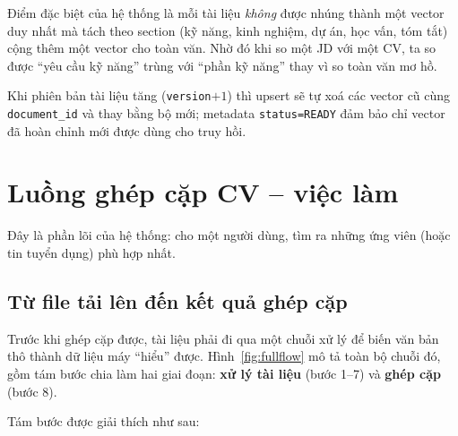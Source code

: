 \documentclass[a4paper,11pt]{article}
\begin{document}
Điểm đặc biệt của hệ thống là mỗi tài liệu \emph{không} được nhúng thành một vector duy
nhất mà tách theo section (kỹ năng, kinh nghiệm, dự án, học vấn, tóm tắt) cộng thêm một
vector cho toàn văn. Nhờ đó khi so một JD với một CV, ta so được ``yêu cầu kỹ năng''
trùng với ``phần kỹ năng'' thay vì so toàn văn mơ hồ.



Khi phiên bản tài liệu tăng (\texttt{version}$+1$) thì upsert sẽ tự xoá các vector cũ
cùng \texttt{document\_id} và thay bằng bộ mới; metadata \texttt{status=READY} đảm bảo
chỉ vector đã hoàn chỉnh mới được dùng cho truy hồi.

\section{Luồng ghép cặp CV -- việc làm}

Đây là phần lõi của hệ thống: cho một người dùng, tìm ra những ứng viên (hoặc tin
tuyển dụng) phù hợp nhất.

\subsection{Từ file tải lên đến kết quả ghép cặp}

Trước khi ghép cặp được, tài liệu phải đi qua một chuỗi xử lý để biến văn bản thô thành
dữ liệu máy ``hiểu'' được. Hình~\ref{fig:fullflow} mô tả toàn bộ chuỗi đó, gồm tám bước
chia làm hai giai đoạn: \textbf{xử lý tài liệu} (bước 1--7) và \textbf{ghép cặp}
(bước 8).



Tám bước được giải thích như sau:
\end{document}
